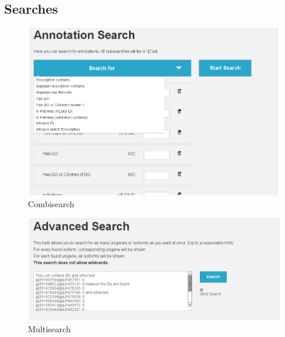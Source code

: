 \documentclass[english]{scrartcl}
\begin{document}
\subsection{Searches}
\begin{figure}
\begin{center}
  \includegraphics[width=\textwidth]{figures/combisearch.png}
  \caption{Combisearch}
  \label{fig:combisearch}
\end{center}
\end{figure}
\begin{figure}
\begin{center}
  \includegraphics[width=\textwidth]{figures/multisearch.png}
  \caption{Multisearch}
  \label{fig:multisearch}
\end{center}
\end{figure}
\end{document}
